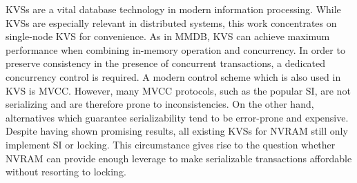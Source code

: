 \acp{KVS} are a vital database technology in modern information processing. While
\acp{KVS} are especially relevant in distributed systems, this work concentrates
on single-node \ac{KVS} for convenience. As in \ac{MMDB}, \ac{KVS} can achieve
maximum performance when combining in-memory operation and concurrency. In order
to preserve consistency in the presence of concurrent transactions, a dedicated
concurrency control is required. A modern control scheme which is also used in
\ac{KVS} is \ac{MVCC}. However, many \ac{MVCC} protocols, such as the popular
\ac{SI}, are not serializing and are therefore prone to inconsistencies. On the
other hand, alternatives which guarantee serializability tend to be error-prone
and expensive. Despite having shown promising results, all existing \acp{KVS} for
\ac{NVRAM} still only implement \ac{SI} or locking. This circumstance gives rise
to the question whether \ac{NVRAM} can provide enough leverage to make
serializable transactions affordable without resorting to locking.

